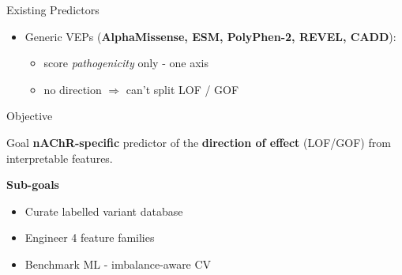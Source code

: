 \documentclass[aspectratio=169]{beamer}
\begin{document}
\begin{frame}{Existing Predictors}
\begin{itemize}\setlength\itemsep{0.5em}
  \item Generic VEPs (\textbf{AlphaMissense, ESM, PolyPhen-2, REVEL, CADD}):
        \begin{itemize}
          \item score \emph{pathogenicity} only - one axis
          \item no direction $\Rightarrow$ can't split LOF / GOF
        \end{itemize}
  
\end{itemize}
\vspace{0.2cm}
\begin{table}
\centering
\footnotesize
{}
\caption{Directly comparable direction-of-effect predictors.}
\end{table}
\end{frame}

\begin{frame}{Objective}
\begin{block}{Goal}
\textbf{nAChR-specific} predictor of the \textbf{direction of effect}
(\textcolor{lofcolor}{LOF}/\textcolor{gofcolor}{GOF}) from interpretable features.
\end{block}
\vspace{0.3cm}
\textbf{Sub-goals}
\begin{itemize}\setlength\itemsep{0.5em}
  \item Curate labelled variant database
  \item Engineer 4 feature families
  \item Benchmark ML - imbalance-aware CV
\end{itemize}
\end{frame}
\end{document}
